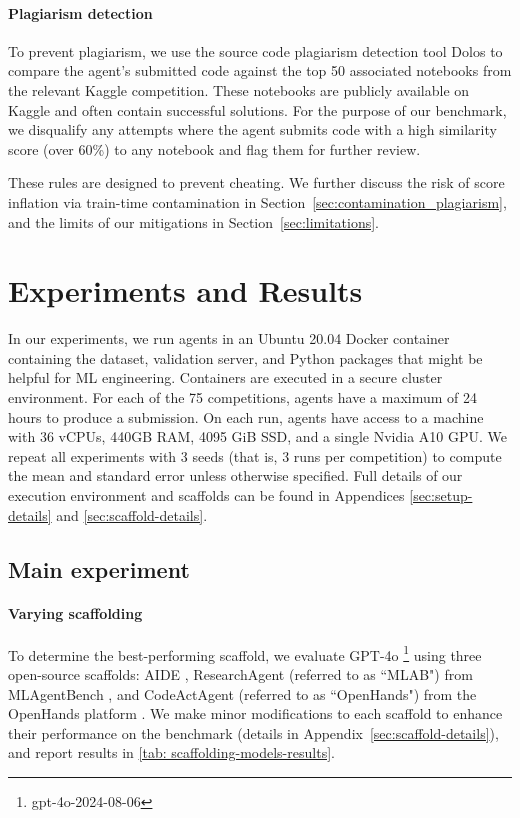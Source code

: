 \documentclass{article} %
\begin{document}
\paragraph{Plagiarism detection}
To prevent plagiarism, we use the source code plagiarism detection tool Dolos \citep{maertens_discovering_2024} to compare the agent's submitted code against the top 50 associated notebooks from the relevant Kaggle competition. These notebooks are publicly available on Kaggle and often contain successful solutions. For the purpose of our benchmark, we disqualify any attempts where the agent submits code with a high similarity score (over 60\%) to any notebook and flag them for further review. 

These rules are designed to prevent cheating. We further discuss the risk of score inflation via train-time contamination in Section~\ref{sec:contamination_plagiarism}, and the limits of our mitigations in Section~\ref{sec:limitations}.

\section{Experiments and Results}
\label{sec:experiments_and_results}

In our experiments, we run agents in an Ubuntu 20.04 Docker container containing the dataset, validation server, and Python packages that might be helpful for ML engineering. Containers are executed in a secure cluster environment. For each of the 75 competitions, agents have a maximum of 24 hours to produce a submission. On each run, agents have access to a machine with 36 vCPUs, 440GB RAM, 4095 GiB SSD, and a single Nvidia A10 GPU. We repeat all experiments with 3 seeds (that is, 3 runs per competition) to compute the mean and standard error unless otherwise specified.
Full details of our execution environment and scaffolds can be found in Appendices \ref{sec:setup-details} and \ref{sec:scaffold-details}.

\subsection{Main experiment}
\paragraph{Varying scaffolding}
To determine the best-performing scaffold, we evaluate GPT-4o \footnote{gpt-4o-2024-08-06} using three open-source scaffolds: AIDE \citep{wecoai_wecoaiaideml_2024}, ResearchAgent (referred to as ``MLAB") from MLAgentBench \citep{huang_mlagentbench_2024}, and CodeActAgent (referred to as ``OpenHands") from the OpenHands platform \citep{all-hands-ai_all-hands-aiopenhands_2024}. We make minor modifications to each scaffold to enhance their performance on the benchmark (details in Appendix~\ref{sec:scaffold-details}), and report results in \autoref{tab: scaffolding-models-results}.
\end{document}
